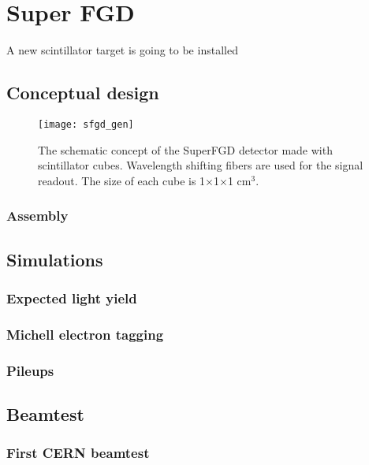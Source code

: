\documentclass[main.tex]{subfiles}
\begin{document}
\renewcommand{\labelitemi}{\ding{226}}
\renewcommand{\labelitemii}{\ding{227}}

\chapter{Super FGD}
\label{ch:up:sfgd}
A new scintillator target is going to be installed

\section{Conceptual design}

\begin{figure}[!ht]
	\centering
	\texttt{[image: sfgd\_gen]}
	\caption{The schematic concept of the SuperFGD detector made with scintillator cubes. Wavelength shifting fibers are used for the signal readout. The size of each cube is 1$\times$1$\times$1 $\text{cm}^3$.}
	\label{fig:up:sfgd:gen}
\end{figure}

\subsection{Assembly}

\section{Simulations}

\subsection{Expected light yield}

\subsection{Michell electron tagging}

\subsection{Pileups}






\section{Beamtest}

\subsection{First CERN beamtest}
\end{document}
